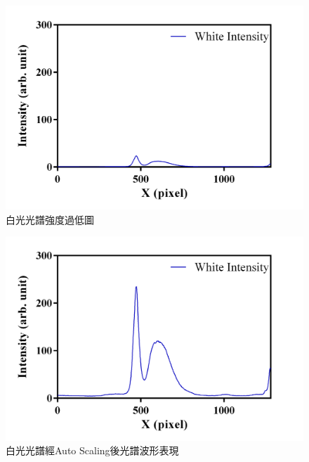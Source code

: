 \begin{figure}[H] %
	\centering %
	\setlength{\belowcaptionskip}{-1cm} 
	\setlength{\abovecaptionskip}{0.cm}
	\includegraphics[width=\textwidth]{figures/White_weak.PNG} %
	\caption{白光光譜強度過低圖} %
	\label{白光光譜強度過低圖} %
\end{figure}\newpage
\begin{figure}[H] %
	\centering %
	\setlength{\abovecaptionskip}{0.cm}
	\includegraphics[width=\textwidth]{figures/White_As.PNG} %
	\caption{白光光譜經Auto Scaling後光譜波形表現} %
	\label{白光光譜經Auto Scaling後光譜波形表現} %
\end{figure}
